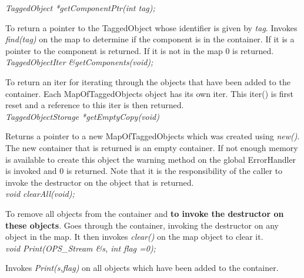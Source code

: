 {\em TaggedObject *getComponentPtr(int tag);}

To return a pointer to the TaggedObject whose identifier is given by
{\em tag}. Invokes {\em find(tag)} on the map to determine if the
component is in the container. If it is a pointer to the component is
returned. If it is not in the map $0$ is returned. \\

{\em TaggedObjectIter \&getComponents(void);}

To return an iter for iterating through the objects that have been
added to the container. Each MapOfTaggedObjects object has its own iter. This
iter() is first reset and a reference to this iter is then returned.\\ 

{\em TaggedObjectStorage *getEmptyCopy(void)}

Returns a pointer to a new MapOfTaggedObjects which was created using
{\em new()}. The new container that is returned is an empty container.
If not enough memory is available to create this object the warning
method on the global ErrorHandler is invoked and $0$ is returned.
Note that it is the responsibility of the caller to invoke the destructor on the
object that is returned. \\


{\em void clearAll(void);}

To remove all objects from the container and {\bf to invoke the
destructor on these objects}. Goes through the container, invoking the
destructor on any object in the map. It then invokes {\em clear()} on
the map object to clear it. \\

{\em void Print(OPS_Stream \&s, int flag =0);}

Invokes {\em Print(s,flag)} on all objects which have been added to
the container. 






